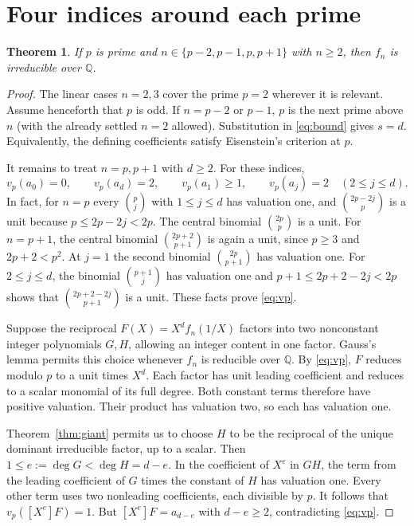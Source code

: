 \documentclass[10pt]{article}
\newtheorem{theorem}{Theorem}
\newcommand{\Q}{\mathbb Q}
\begin{document}
\section{Four indices around each prime}
\begin{theorem}\label{thm:four}
If $p$ is prime and $n\in\{p-2,p-1,p,p+1\}$ with $n\ge2$, then $f_n$ is irreducible over $\Q$.
\end{theorem}
\begin{proof}
The linear cases $n=2,3$ cover the prime $p=2$ wherever it is relevant. Assume henceforth that $p$ is odd. If $n=p-2$ or $p-1$, $p$ is the next prime above $n$ (with the already settled $n=2$ allowed). Substitution in \eqref{eq:bound} gives $s=d$. Equivalently, the defining coefficients satisfy Eisenstein's criterion at $p$.

It remains to treat $n=p,p+1$ with $d\ge2$. For these indices,
\begin{equation}\label{eq:vp}
 v_p(a_0)=0,\qquad v_p(a_d)=2,\qquad
 v_p(a_1)\ge1,\qquad v_p(a_j)=2\quad(2\le j\le d).
\end{equation}
In fact, for $n=p$ every $\binom pj$ with $1\le j\le d$ has valuation one, and $\binom{2p-2j}{p}$ is a unit because $p\le2p-2j<2p$. The central binomial $\binom{2p}p$ is a unit. For $n=p+1$, the central binomial $\binom{2p+2}{p+1}$ is again a unit, since $p\ge3$ and $2p+2<p^2$. At $j=1$ the second binomial $\binom{2p}{p+1}$ has valuation one. For $2\le j\le d$, the binomial $\binom{p+1}j$ has valuation one and $p+1\le2p+2-2j<2p$ shows that $\binom{2p+2-2j}{p+1}$ is a unit. These facts prove \eqref{eq:vp}.

Suppose the reciprocal $F(X)=X^df_n(1/X)$ factors into two nonconstant integer polynomials $G,H$, allowing an integer content in one factor. Gauss's lemma permits this choice whenever $f_n$ is reducible over $\Q$. By \eqref{eq:vp}, $F$ reduces modulo $p$ to a unit times $X^d$. Each factor has unit leading coefficient and reduces to a scalar monomial of its full degree. Both constant terms therefore have positive valuation. Their product has valuation two, so each has valuation one.

Theorem~\ref{thm:giant} permits us to choose $H$ to be the reciprocal of the unique dominant irreducible factor, up to a scalar. Then $1\le e:=\deg G<\deg H=d-e$. In the coefficient of $X^e$ in $GH$, the term from the leading coefficient of $G$ times the constant of $H$ has valuation one. Every other term uses two nonleading coefficients, each divisible by $p$. It follows that $v_p([X^e]F)=1$. But $[X^e]F=a_{d-e}$ with $d-e\ge2$, contradicting \eqref{eq:vp}.
\end{proof}
\end{document}
